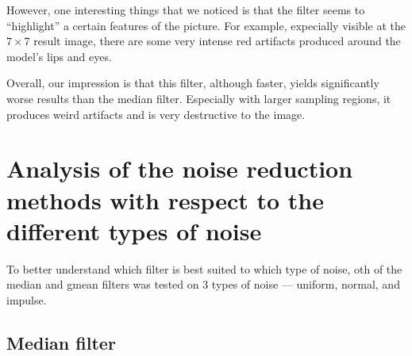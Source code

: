 \documentclass[12pt]{article}
\begin{document}
However, one interesting things that we noticed is that the filter seems to ``highlight'' a certain features of the picture.
For example, expecially visible at the $7\times7$ result image, there are some very intense red artifacts produced around the model's lips and eyes.

Overall, our impression is that this filter, although faster, yields significantly worse results than the median filter.
Especially with larger sampling regions, it produces weird artifacts and is very destructive to the image.

\section{Analysis of the noise reduction methods with respect to the different types of noise}

To better understand which filter is best suited to which type of noise,
oth of the median and gmean filters was tested on 3 types of noise --- uniform, normal, and impulse.

\subsection{Median filter}
\end{document}
